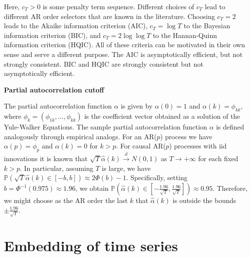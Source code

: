 Here, $c_T>0$ is some penalty term sequence. Different choices of $c_T$ lead to different AR order selectors that are known in the literature. Choosing $c_T=2$ leads to the Akaike information criterion (AIC), $c_T=\log{T}$ to the Bayesian information criterion (BIC), and $c_T=2\log{\log{T}}$ to the Hannan-Quinn information criterion (HQIC). All of these criteria can be motivated in their own sense and serve a different purpose. The AIC is asymptotically efficient, but not strongly consistent. BIC and HQIC are strongly consistent but not asymptotically efficient.


\textbf{Partial autocorrelation cutoff}

The partial autocorrelation function $\alpha$ is given by $\alpha(0)=1$ and $\alpha(k)=\phi_{kk}$, where $\phi_k=(\phi_{1k},\dots,\phi_{kk})$ is the coefficient vector obtained as a solution of the Yule-Walker Equations. The sample partial autocorrelation function $\hat{\alpha}$ is defined analogously through empirical analogs. For an AR($p$) process we have $\alpha(p)=\phi_p$ and $\alpha(k)=0$ for $k>p$. For causal AR($p$) processes with iid innovations it is known that $\sqrt{T}\hat{\alpha}(k)\stackrel{d}{\to}N(0,1)$ as $T\to+\infty$ for each fixed $k>p$. In particular, assuming $T$ is large, we have $\mathbb{P}(\sqrt{T}\hat{\alpha}(k)\in[-b,b])\approx2\Phi(b)-1$. Specifically, setting $b=\Phi^{-1}(0.975)\approx1.96$, we obtain $\mathbb{P}(\hat{\alpha}(k)\in[-\frac{1.96}{\sqrt{T}},\frac{1.96}{\sqrt{T}}])\approx0.95$. Therefore, we might choose as the AR order the last $k$ that $\hat\alpha(k)$ is outside the bounds $\pm\frac{1.96}{\sqrt{T}}$.



\section{Embedding of time series}


